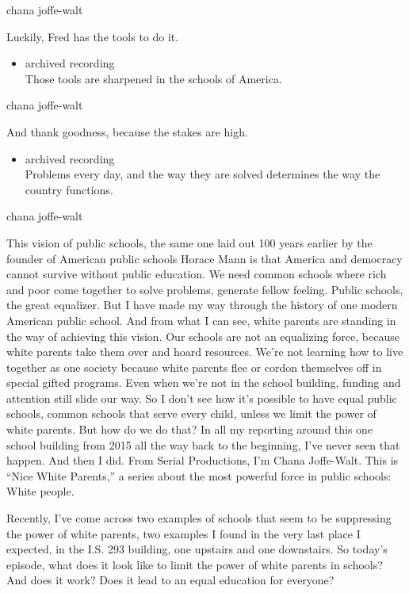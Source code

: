 chana joffe-walt

Luckily, Fred has the tools to do it.

\begin{itemize}
\tightlist
\item
  archived recording\\
  Those tools are sharpened in the schools of America.
\end{itemize}

chana joffe-walt

And thank goodness, because the stakes are high.

\begin{itemize}
\tightlist
\item
  archived recording\\
  Problems every day, and the way they are solved determines the way the
  country functions.
\end{itemize}

chana joffe-walt

This vision of public schools, the same one laid out 100 years earlier
by the founder of American public schools Horace Mann is that America
and democracy cannot survive without public education. We need common
schools where rich and poor come together to solve problems, generate
fellow feeling. Public schools, the great equalizer. But I have made my
way through the history of one modern American public school. And from
what I can see, white parents are standing in the way of achieving this
vision. Our schools are not an equalizing force, because white parents
take them over and hoard resources. We're not learning how to live
together as one society because white parents flee or cordon themselves
off in special gifted programs. Even when we're not in the school
building, funding and attention still slide our way. So I don't see how
it's possible to have equal public schools, common schools that serve
every child, unless we limit the power of white parents. But how do we
do that? In all my reporting around this one school building from 2015
all the way back to the beginning, I've never seen that happen. And then
I did. From Serial Productions, I'm Chana Joffe-Walt. This is ``Nice
White Parents,'' a series about the most powerful force in public
schools: White people.

Recently, I've come across two examples of schools that seem to be
suppressing the power of white parents, two examples I found in the very
last place I expected, in the I.S. 293 building, one upstairs and one
downstairs. So today's episode, what does it look like to limit the
power of white parents in schools? And does it work? Does it lead to an
equal education for everyone?

